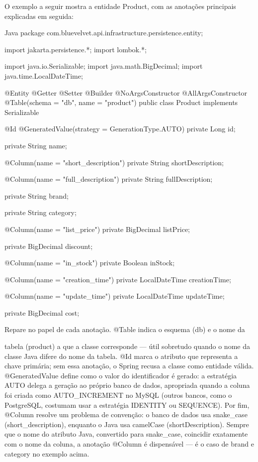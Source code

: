O exemplo a seguir mostra a entidade Product, com as anotações principais explicadas em seguida:

\begin{codebox}{Java}
package com.bluevelvet.api.infrastructure.persistence.entity;

import jakarta.persistence.*;
import lombok.*;

import java.io.Serializable;
import java.math.BigDecimal;
import java.time.LocalDateTime;

@Entity
@Getter
@Setter
@Builder
@NoArgsConstructor
@AllArgsConstructor
@Table(schema = "db", name = "product")
public class Product implements Serializable {

       @Id
       @GeneratedValue(strategy = GenerationType.AUTO)
       private Long id;

       private String name;

       @Column(name = "short_description")
       private String shortDescription;

       @Column(name = "full_description")
       private String fullDescription;

       private String brand;

       private String category;

       @Column(name = "list_price")
       private BigDecimal listPrice;

       private BigDecimal discount;

       @Column(name = "in_stock")
       private Boolean inStock;

       @Column(name = "creation_time")
       private LocalDateTime creationTime;

       @Column(name = "update_time")
       private LocalDateTime updateTime;



        private BigDecimal cost;
 }

   Repare no papel de cada anotação. @Table indica o esquema (db) e o nome da
\end{codebox}

tabela (product) a que a classe corresponde — útil sobretudo quando o nome da classe Java difere do nome da tabela. @Id marca o atributo que representa a chave primária; sem essa anotação, o Spring recusa a classe como entidade válida. @GeneratedValue define como o valor do identificador é gerado: a estratégia AUTO delega a geração ao próprio banco de dados, apropriada quando a coluna foi criada como AUTO\_INCREMENT no MySQL (outros bancos, como o PostgreSQL, costumam usar a estratégia IDENTITY ou SEQUENCE). Por fim, @Column resolve um problema de convenção: o banco de dados usa snake\_case (short\_description), enquanto o Java usa camelCase (shortDescription). Sempre que o nome do atributo Java, convertido para snake\_case, coincidir exatamente com o nome da coluna, a anotação @Column é dispensável — é o caso de brand e category no exemplo acima.

